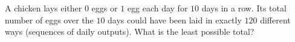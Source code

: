A chicken lays either $0$ eggs or $1$ egg each day for $10$ days in a row. Its total number of eggs over the $10$ days could have been laid in exactly $120$ different ways (sequences of daily outputs). What is the least possible total?

